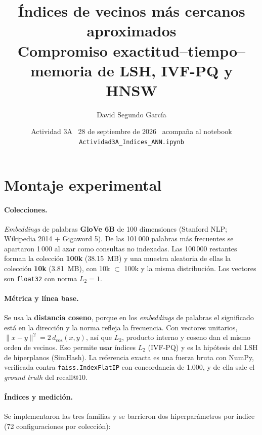 \documentclass[10pt,a4paper]{article}
\title{\vspace{-1.5cm}\textbf{Índices de vecinos más cercanos aproximados}\\[2pt]
\large Compromiso exactitud--tiempo--memoria de LSH, IVF-PQ y HNSW}
\author{David Segundo García}
\date{\vspace{-0.3cm}Actividad 3A \textperiodcentered\ 28 de septiembre de 2026
\textperiodcentered\ acompaña al notebook \texttt{Actividad3A\_Indices\_ANN.ipynb}}
\begin{document}
\maketitle
\vspace{-0.9cm}

\section{Montaje experimental}

\paragraph{Colecciones.} \emph{Embeddings} de palabras \textbf{GloVe 6B} de 100 dimensiones
(Stanford NLP; Wikipedia 2014 + Gigaword 5). De las 101\,000 palabras más frecuentes se apartaron
1\,000 al azar como consultas no indexadas. Las 100\,000 restantes forman la colección
\textbf{100k} (38.15~MB) y una muestra aleatoria de ellas la colección \textbf{10k} (3.81~MB), con
10k $\subset$ 100k y la misma distribución. Los vectores son \texttt{float32} con norma $L_2=1$.

\paragraph{Métrica y línea base.} Se usa la \textbf{distancia coseno}, porque en los
\emph{embeddings} de palabras el significado está en la dirección y la norma refleja la frecuencia.
Con vectores unitarios, $\lVert x-y\rVert^2 = 2\,d_{\cos}(x,y)$, así que $L_2$, producto interno y
coseno dan el mismo orden de vecinos. Eso permite usar índices $L_2$ (IVF-PQ) y es la hipótesis del
LSH de hiperplanos (SimHash). La referencia exacta es una fuerza bruta con NumPy, verificada contra
\texttt{faiss.IndexFlatIP} con concordancia de 1.000, y de ella sale el \emph{ground truth} del
recall@10.

\paragraph{Índices y medición.} Se implementaron las tres familias y se barrieron dos
hiperparámetros por índice (72 configuraciones por colección):
\end{document}
